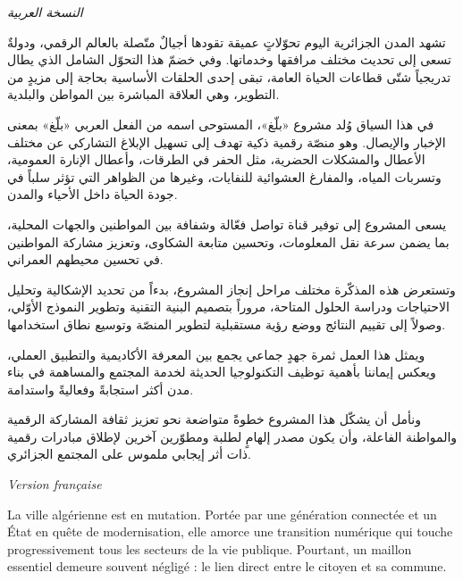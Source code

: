 \documentclass[12pt,a4paper]{report}
\begin{document}
\begin{flushright}
  {\small\textcolor{muted}{\textit{النسخة العربية}}}
\end{flushright}

\vspace{0.4cm}

\begin{RLtext}
  تشهد المدن الجزائرية اليوم تحوّلاتٍ عميقة تقودها أجيالٌ متّصلة بالعالم الرقمي، ودولةٌ تسعى إلى تحديث مختلف مرافقها وخدماتها. وفي خضمّ هذا التحوّل الشامل الذي يطال تدريجياً شتّى قطاعات الحياة العامة، تبقى إحدى الحلقات الأساسية بحاجة إلى مزيدٍ من التطوير، وهي العلاقة المباشرة بين المواطن والبلدية.

  في هذا السياق وُلد مشروع «بلّغ»، المستوحى اسمه من الفعل العربي «بلّغ» بمعنى الإخبار والإيصال. وهو منصّة رقمية ذكية تهدف إلى تسهيل الإبلاغ التشاركي عن مختلف الأعطال والمشكلات الحضرية، مثل الحفر في الطرقات، وأعطال الإنارة العمومية، وتسربات المياه، والمفارغ العشوائية للنفايات، وغيرها من الظواهر التي تؤثر سلباً في جودة الحياة داخل الأحياء والمدن.

  يسعى المشروع إلى توفير قناة تواصل فعّالة وشفافة بين المواطنين والجهات المحلية، بما يضمن سرعة نقل المعلومات، وتحسين متابعة الشكاوى، وتعزيز مشاركة المواطنين في تحسين محيطهم العمراني.

  وتستعرض هذه المذكّرة مختلف مراحل إنجاز المشروع، بدءاً من تحديد الإشكالية وتحليل الاحتياجات ودراسة الحلول المتاحة، مروراً بتصميم البنية التقنية وتطوير النموذج الأوّلي، وصولاً إلى تقييم النتائج ووضع رؤية مستقبلية لتطوير المنصّة وتوسيع نطاق استخدامها.

  ويمثل هذا العمل ثمرة جهدٍ جماعي يجمع بين المعرفة الأكاديمية والتطبيق العملي، ويعكس إيماننا بأهمية توظيف التكنولوجيا الحديثة لخدمة المجتمع والمساهمة في بناء مدن أكثر استجابةً وفعاليةً واستدامة.

  ونأمل أن يشكّل هذا المشروع خطوةً متواضعة نحو تعزيز ثقافة المشاركة الرقمية والمواطنة الفاعلة، وأن يكون مصدر إلهامٍ لطلبة ومطوّرين آخرين لإطلاق مبادرات رقمية ذات أثر إيجابي ملموس على المجتمع الجزائري.
\end{RLtext}

\vspace{0.8cm}

\newpage

{\small\textcolor{muted}{\textit{Version française}}}
\vspace{0.4cm}

La ville algérienne est en mutation. Portée par une génération connectée et un
État en quête de modernisation, elle amorce une transition numérique qui touche
progressivement tous les secteurs de la vie publique. Pourtant, un maillon
essentiel demeure souvent négligé : le lien direct entre le citoyen et sa
commune.
\end{document}
